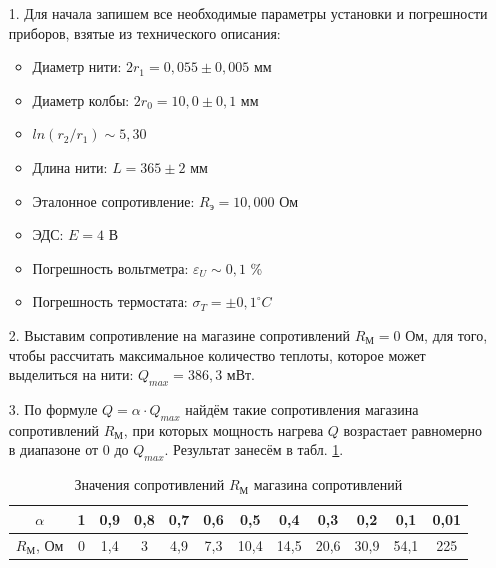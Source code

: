 \documentclass[a4paper, 12pt]{article}
\begin{document}
    \begin{enumerate}
    
        \item[1.] Для начала запишем все необходимые параметры установки и погрешности приборов, взятые из технического описания:
        \begin{itemize}
            \item Диаметр нити: $2 r_1 = 0,055 \pm 0,005$ мм
            \item Диаметр колбы: $2 r_0 = 10,0 \pm 0,1$ мм
            \item $ln(r_2 / r_1) \sim 5,30$
            \item Длина нити: $L = 365 \pm 2$ мм
            \item Эталонное сопротивление: $R_э = 10,000$ Ом
            \item ЭДС: $E = 4$ В
            \item Погрешность вольтметра: $\varepsilon_U \sim 0,1$ \%
            \item Погрешность термостата: $\sigma_T = \pm 0,1^\circ C$
        \end{itemize}
        
        \item[2.] Выставим сопротивление на магазине сопротивлений $R_М = 0$ Ом, для того, чтобы рассчитать максимальное количество теплоты, которое может выделиться на нити: $Q_{max} = 386,3$ мВт.
    
        \item[3.] По формуле $Q = \alpha \cdot Q_{max}$ найдём такие сопротивления магазина сопротивлений $R_{М}$, при которых мощность нагрева $Q$ возрастает равномерно в диапазоне от 0 до $Q_{max}$. Результат занесём в табл. \ref{table1}.
        
        \begin{table}[ht]
            \centering
            \begin{tabular}{|c|c|c|c|c|c|c|c|c|c|c|c|}
                \hline
                $\alpha$ & 1 & 0,9 & 0,8 & 0,7 & 0,6 & 0,5 & 0,4 & 0,3 & 0,2 & 0,1 & 0,01 \\
                \hline
                $R_{М}$, Ом & 0 & 1,4 & 3 & 4,9 & 7,3 & 10,4 & 14,5 & 20,6 & 30,9 & 54,1 & 225 \\
                \hline
            \end{tabular}
            \caption{Значения сопротивлений $R_{М}$ магазина сопротивлений}
            \label{table1}
        \end{table}
        

\end{enumerate}
\end{document}
